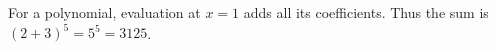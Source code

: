 For a polynomial, evaluation at $x=1$ adds all its coefficients. Thus the sum is $(2+3)^5=5^5=\boxed{3125}$.
